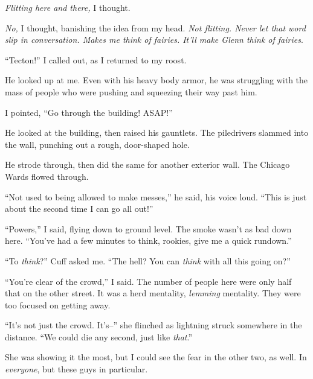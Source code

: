 \emph{Flitting here and there, }I thought.



\emph{No,} I thought, banishing the idea from my head.  \emph{Not flitting.  Never let that word slip in conversation.  Makes me think of fairies.  It'll make Glenn think of fairies}.



``Tecton!'' I called out, as I returned to my roost.



He looked up at me.  Even with his heavy body armor, he was struggling with the mass of people who were pushing and squeezing their way past him.



I pointed, ``Go through the building!  ASAP!''



He looked at the building, then raised his gauntlets.  The piledrivers slammed into the wall, punching out a rough, door-shaped hole.



He strode through, then did the same for another exterior wall.  The Chicago Wards flowed through.



``Not used to being allowed to make messes,'' he said, his voice loud.  ``This is just about the second time I can go all out!''



``Powers,'' I said, flying down to ground level.  The smoke wasn't as bad down here.  ``You've had a few minutes to think, rookies, give me a quick rundown.''



``To \emph{think}?'' Cuff asked me.  ``The hell?  You can \emph{think} with all this going on?''



``You're clear of the crowd,'' I said.  The number of people here were only half that on the other street.  It was a herd mentality, \emph{lemming} mentality.  They were too focused on getting away.



``It's not just the crowd.  It's--'' she flinched as lightning struck somewhere in the distance.  ``We could die any second, just like \emph{that}.''



She was showing it the most, but I could see the fear in the other two, as well.  In \emph{everyone}, but these guys in particular.



